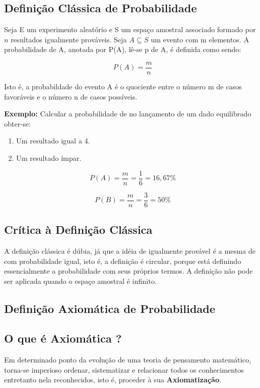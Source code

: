 \documentclass[a4paper,12pt]{report}
\begin{document}
{\subsection{Definição Clássica de Probabilidade}

Seja E um experimento aleatório e S um espaço amostral associado
formado por $n$ resultados igualmente prováveis. Seja $A \subseteq
S$ um evento com m elementos.  A probabilidade de A, anotada por
P(A), lê-se p de A, é definida como sendo:

\begin{equation}\label{}
    P(A)= \frac{m}{n}
\end{equation}

Isto é, a probabildade do evento A é o quociente entre o número m
de casos favoráveis e o número n de casos possíveis.\vskip0.3cm


\textbf{Exemplo:} Calcular a probabilidade de no lançamento de um
dado equilibrado obter-se:

\begin{enumerate}
    \item Um resultado igual a 4.
    \item Um resultado ímpar.
\end{enumerate}

$$
P(A)= \frac{m}{n}=\frac{1}{6}=16,67\%
$$

$$
P(B)= \frac{m}{n}=\frac{3}{6}=50\%
$$


\subsection{Crítica à Definição Clássica}
A definição clássica é dúbia, já que a idéia de igualmente
provável é a mesma de com probabilidade igual, isto é, a definição
é circular, porque está definindo essencialmente a probabilidade
com seus próprios termos. A definição não pode ser aplicada quando
o espaço amostral é infinito.

\subsection{Definição Axiomática de Probabilidade}

\subsection{O que é Axiomática ?}

Em determinado ponto da evolução de uma teoria de pensamento
matemático, torna-se imperioso ordenar, sistematizar e relacionar
todos os conhecimentos entretanto nela reconhecidos, isto é,
proceder à sua \textbf{Axiomatização}.

}
\end{document}
